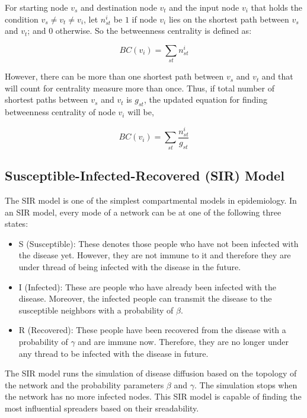 \documentclass[sigconf]{acmart}
\begin{document}
\begin{itemize}
	For starting node $v_s$ and destination node $v_t$ and the input node $v_i$ that holds the condition $v_s \neq v_t \neq v_i$, let $n_{st}^i$ be $1$ if node $v_i$ lies on the shortest path between $v_s$ and $v_t$; and $0$ otherwise. So the betweenness centrality is defined as:
	
	\begin{equation}
	BC(v_i) = \sum_{st}n_{st}^i
	\end{equation}

	However, there can be more than one shortest path between $v_s$ and $v_t$ and that will count for centrality measure more than once. Thus, if total number of shortest paths between $v_s$ and $v_t$ is $g_{st}$, the updated equation for finding betweenness centrality of node $v_i$ will be,
	
	\begin{equation}
	BC(v_i) = \sum_{st} \dfrac{n_{st}^i}{g_{st}}
	\label{betweenness centrality eq}
	\end{equation}	
	
\end{itemize} 

\subsection{Susceptible-Infected-Recovered (SIR) Model}
The SIR model is one of the simplest compartmental models in epidemiology. In an SIR model, every mode of a network can be at one of the following three states:
\begin{itemize}
	\item S (Susceptible): These denotes those people who have not been infected with the disease yet. However, they are not immune to it and therefore they are under thread of being infected with the disease in the future.
	\item I (Infected): These are people who have already been infected with the disease. Moreover, the infected people can transmit the disease to the susceptible neighbors with a probability of $\beta$.
	\item R (Recovered): These people have been recovered from the disease with a probability of $\gamma$ and are immune now. Therefore, they are no longer under any thread to be infected with the disease in future.
\end{itemize} 
The SIR model runs the simulation of disease diffusion based on the topology of the network and the probability parameters $\beta$ and $\gamma$. The simulation stops when the network has no more infected nodes. This SIR model is capable of finding the most influential spreaders based on their sreadability. 
\end{document}
